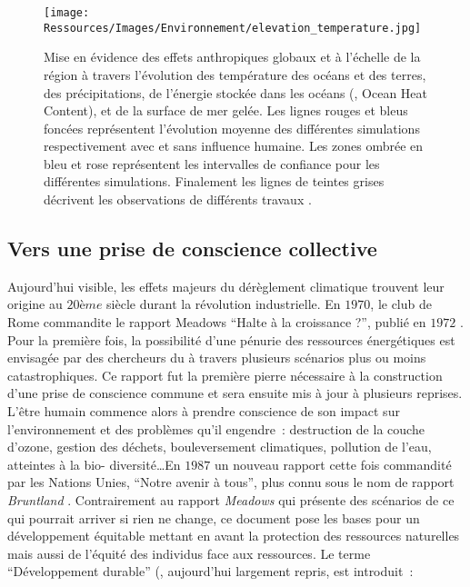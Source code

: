 \begin{figure}
    \centering
    \texttt{[image: Ressources/Images/Environnement/elevation\_temperature.jpg]}
    \caption{Mise en évidence des effets anthropiques globaux et à l’échelle de la région
              à travers l’évolution des température des océans et des terres, des précipitations,
              de l’énergie stockée dans les océans (, Ocean Heat Content), et
              de la surface de mer gelée. Les lignes rouges et bleus foncées représentent l’évolution moyenne
              des différentes simulations respectivement avec et sans influence humaine. Les zones
              ombrée en bleu et rose représentent les intervalles de confiance pour les différentes
              simulations. Finalement les lignes de teintes grises décrivent les observations
              de différents travaux \parencite{AchutaRao2013}.
             }
    \label{fig:evolution_climat}
\end{figure}

\subsection{Vers une prise de conscience collective} %
\label{sub:vers_une_prise_de_conscience_collective}
Aujourd’hui visible, les effets majeurs du dérèglement climatique trouvent leur origine au
$20ème$ siècle durant la révolution industrielle. En $1970$, le club de Rome commandite le
rapport Meadows \enquote{Halte à la croissance ?}, publié en $1972$
\parencite{Meadows1972}. Pour la première fois, la possibilité d’une pénurie des
ressources énergétiques est envisagée par des chercheurs du  à travers plusieurs
scénarios plus ou moins catastrophiques. Ce rapport fut la première pierre nécessaire à la
construction d’une prise de conscience commune et sera ensuite mis à jour à plusieurs
reprises. L’être humain commence alors à prendre conscience de son impact sur
l’environnement et des problèmes qu’il engendre~: destruction de la couche d’ozone,
gestion des déchets, bouleversement climatiques, pollution de l’eau, atteintes à la bio-
diversité\dots En $1987$ un nouveau rapport cette fois commandité par les Nations Unies,
\enquote{Notre avenir à tous}, plus connu sous le nom de rapport \textit{Bruntland} \parencite{Brundtland1987}.
Contrairement au rapport \textit{Meadows} qui présente des scénarios de ce qui pourrait
arriver si rien ne change, ce document pose les bases pour un développement équitable
mettant en avant la protection des ressources naturelles mais aussi de l’équité des
individus face aux ressources. Le terme \enquote{Développement durable} (,
aujourd’hui largement repris, est introduit~:

